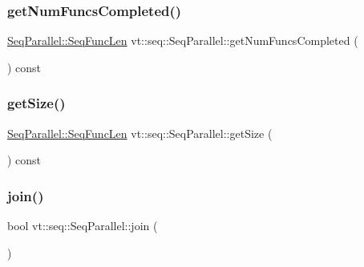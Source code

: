\mbox{\label{structvt_1_1seq_1_1_seq_parallel_a051904f27dbddab87b202c9bb86aa163}} 
\subsubsection{\texorpdfstring{get\+Num\+Funcs\+Completed()}{getNumFuncsCompleted()}}
{\footnotesize\ttfamily \hyperlink{structvt_1_1seq_1_1_seq_parallel_ab6a1d3fc6dbc5210e559c96f57f64e79}{Seq\+Parallel\+::\+Seq\+Func\+Len} vt\+::seq\+::\+Seq\+Parallel\+::get\+Num\+Funcs\+Completed (\begin{DoxyParamCaption}{ }\end{DoxyParamCaption}) const}

\mbox{\label{structvt_1_1seq_1_1_seq_parallel_aa8fb8295fd13135a7bd989f570fe8cb9}} 
\subsubsection{\texorpdfstring{get\+Size()}{getSize()}}
{\footnotesize\ttfamily \hyperlink{structvt_1_1seq_1_1_seq_parallel_ab6a1d3fc6dbc5210e559c96f57f64e79}{Seq\+Parallel\+::\+Seq\+Func\+Len} vt\+::seq\+::\+Seq\+Parallel\+::get\+Size (\begin{DoxyParamCaption}{ }\end{DoxyParamCaption}) const}

\mbox{\label{structvt_1_1seq_1_1_seq_parallel_a57f8521e9444d248d46957cc3677db08}} 
\subsubsection{\texorpdfstring{join()}{join()}}
{\footnotesize\ttfamily bool vt\+::seq\+::\+Seq\+Parallel\+::join (\begin{DoxyParamCaption}{ }\end{DoxyParamCaption})}

